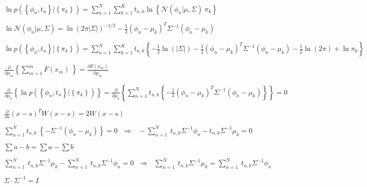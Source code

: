 \documentclass{article}
\begin{document}
$ \displaystyle
    \ln{
        p\left(\left\{\phi_n,t_n\right\}|\left\{\pi_k\right\}\right)
    }=
    \sum_{n=1}^{N}{
        \sum_{k=1}^{K}{t_{n,k}{
            \ln{
                \left\{\mathcal{N}\left(\phi_n|\mu,\Sigma\right)\ \pi_k\right\}}
            }
        }
    }
$
\begin{center}
    $\displaystyle \ln{\mathcal{N}\left(\phi_n|\mu,\Sigma\right)}=\ln{\left(2\pi\left|\Sigma\right|\right)^{-1/2}}-\frac{1}{2}\left(\phi_n-\mu_k\right)^T\Sigma^{-1}\left(\phi_n-\mu_k\right) $
\end{center}

$\displaystyle
    \ln{
        p\left(\left\{\phi_n,t_n\right\}|\left\{\pi_k\right\}\right)
    }=\sum_{n=1}^{N}{
        \sum_{k=1}^{K}{t_{n,k}{
            \left\{-\frac{1}{2}\ln{\left(\left|\Sigma\right|\right)}-\frac{1}{2}\left(\phi_n-\mu_k\right)^T\Sigma^{-1}\left(\phi_n-\mu_k\right)-\frac{1}{2}\ln{\left(2\pi\right)}+\ln{\pi_k}\right\}}
        }
    }
$
\begin{center}
    $\displaystyle \frac{\partial}{\partial\mu_m}\left\{\sum_{m=1}^{m}{F\left(x_m\right)\ }\right\}=\frac{\partial F\left(x_m\right)}{\partial\mu_m}$
\end{center}

$ \displaystyle
    \frac{\partial}{\partial\mu_k}\left\{\ln{p\left(\left\{\phi_n,t_n\right\}|\left\{\pi_k\right\}\right)}\right\}=\frac{\partial}{\partial\mu_k}\left\{\sum_{n=1}^{N}{t_{n,k}\left\{-\frac{1}{2}\left(\phi_n-\mu_k\right)^T\Sigma^{-1}\left(\phi_n-\mu_k\right)\right\}}\right\}=0
$

\begin{center}
    $ \displaystyle \frac{\partial}{\partial s}\left(x-s\right)^TW\left(x-s\right)=2W\left(x-s\right) $
\end{center}

$ \displaystyle
    \sum_{n=1}^{N}{t_{n,k}\ \left\{-\Sigma^{-1}\left(\phi_n-\mu_k\right)\right\}}=0\ \ \ \Longrightarrow\ \ \ -\sum_{n=1}^{N}{\ t_{n,k}\Sigma^{-1}\phi_n-t_{n,k}\Sigma^{-1}\mu_k}=0
$

\begin{center}
    $\displaystyle  \sum{a-b}=\sum a-\sum b $
\end{center}

$ \displaystyle
    \sum_{n=1}^{N}{\ t_{n,k}\Sigma^{-1}\mu_k}-\sum_{n=1}^{N}{\ t_{n,k}\Sigma^{-1}\phi_n}=0\ \ \ \Longrightarrow\ \ \ \sum_{n=1}^{N}{\ t_{n,k}\Sigma^{-1}\mu_k}=\sum_{n=1}^{N}{\ t_{n,k}\Sigma^{-1}\phi_n}
$

\begin{center}
    $ \displaystyle \Sigma \cdot \Sigma^{-1}=I $
\end{center}
\end{document}
